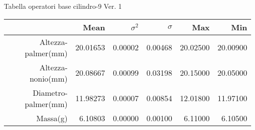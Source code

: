 \documentclass[11pt,a4paper,oneside,openany3] {report}
\begin{document}
\newpage
Tabella operatori base cilindro-9 Ver. 1
\begin{table}[ht]
\centering
\begin{tabular}{rrrrrr}
  \hline
 & Mean & $\sigma^2$ & $\sigma$ & Max & Min \\ 
  \hline
Altezza-palmer(mm) & 20.01653 & 0.00002 & 0.00468 & 20.02500 & 20.00900 \\
  Altezza-nonio(mm) & 20.08667 & 0.00099 & 0.03198 & 20.15000 & 20.05000 \\ 
  Diametro-palmer(mm) & 11.98273 & 0.00007 & 0.00854 & 12.01800 & 11.97100 \\ 
  Massa(g)  & 6.10803 & 0.00000 & 0.00100 & 6.11000 & 6.10500 \\ 
   \hline
\end{tabular}
\end{table}
\end{document}
